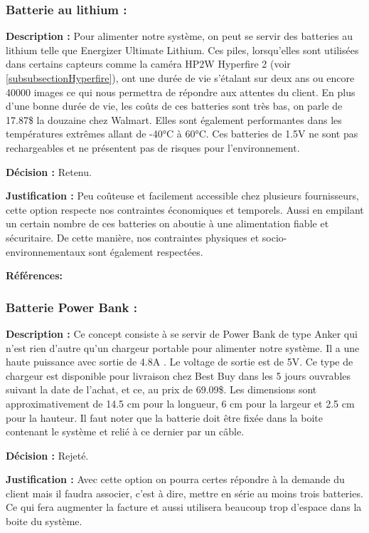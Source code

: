 \subsubsection{Batterie au lithium :}

\textbf{Description :}
Pour alimenter notre système, on peut se servir des batteries au lithium telle que Energizer Ultimate Lithium. Ces piles, lorsqu'elles sont utilisées dans certains capteurs comme la caméra HP2W Hyperfire 2 (voir \ref{subsubsectionHyperfire}), ont une durée de vie s'étalant sur deux ans ou encore 40000 images ce qui nous permettra de répondre aux attentes du client. En plus d'une bonne durée de vie, les coûts de ces batteries sont très bas, on parle de 17.87\$ la douzaine chez Walmart. Elles sont également performantes dans les températures extrêmes allant de -40°C à 60°C. Ces batteries de 1.5V ne sont pas rechargeables et ne présentent pas de risques pour l'environnement.
 
 \textbf{Décision :}
 Retenu.
 
 \textbf{Justification :}
 Peu coûteuse et facilement accessible chez plusieurs fournisseurs, cette option respecte nos contraintes économiques et temporels. Aussi en empilant un certain nombre de ces batteries on aboutie à une alimentation fiable et sécuritaire. De cette manière, nos contraintes physiques et socio-environnementaux sont également respectées.
 
\textbf{Références:} \cite{Lithium}

\subsubsection{Batterie Power Bank :}
\textbf{Description :}
 Ce concept consiste à se servir de Power Bank de type Anker qui n'est rien d'autre qu'un chargeur portable pour alimenter notre système. Il a une haute puissance avec sortie de 4.8A . Le voltage de sortie est de 5V. Ce type de chargeur est disponible pour livraison chez Best Buy dans les 5 jours ouvrables suivant la date de l'achat, et ce, au prix de 69.09\$. Les dimensions sont approximativement de 14.5 cm pour la longueur, 6 cm pour la largeur et 2.5 cm pour la hauteur. Il faut noter que la batterie doit être fixée dans la boite contenant le système et relié à ce dernier par un câble.
 
\textbf{Décision :}
 Rejeté.
 
\textbf{Justification :}
Avec cette option on pourra certes répondre à la demande du client mais il faudra associer, c'est à dire, mettre en série au moins trois batteries. Ce qui fera augmenter la facture et aussi utilisera beaucoup trop d'espace  dans la boite du système.
 
